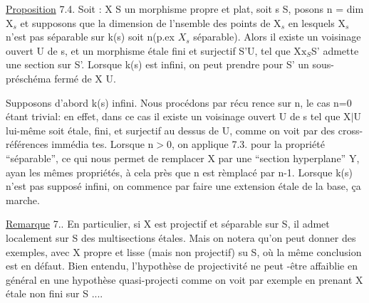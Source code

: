 





\uline{Proposition} 7.4. Soit : X \hand{$\longrightarrow$} S un morphisme propre et plat, 
soit s \hand{$\in$} S,  posons n = dim X$_{s}$ et supposons que la dimension de
l'nsemble des points de X$_{s}$ en lesquels X$_{s}$ n'est pas séparable sur k(s)
soit \hand{$<$} n(p.ex $X_s$ séparable). Alors il existe un voisinage ouvert U de s, et un morphisme
étale fini et surjectif S'\hand{$\longrightarrow$}U, tel que X$\mathrm{x}_{S}$S' admette une section sur S'.
Lorsque k(s) est infini, on peut prendre pour S' un sous-préschéma fermé
de X U.

Supposons d'abord k(s) infini. Nous  procédons par récu%
rence sur n, le cas n=0 étant trivial: en effet, dans ce cas il existe
un voisinage ouvert U de s tel que X$|$U lui-même soit étale, fini, et
surjectif au dessus de U, comme on voit par des cross-références immédia
tes. Lorsque n$>$0, on applique 7.3. pour la propriété ``séparable'', ce qui
nous permet de  remplacer X par une ``section hyperplane'' Y, ayan
les mêmes propriétés, à cela près que n est rèmplacé par n-1. Lorsque
k(s) n'est pas supposé infini, on commence par faire une extension étale
de la base, ça marche.

\uline{Remarque} 7.. En particulier, si X est projectif et séparable sur S,
il admet localement sur S des multisections étales. Mais on notera qu'on
peut donner des exemples, avec X propre et lisse (mais non projectif) su
S, où la même conclusion est en défaut. Bien entendu, l'hypothèse de
 projectivité ne peut -être affaiblie en général en une hypothèse quasi-projecti
comme on voit par exemple en prenant X étale non fini sur S ....


